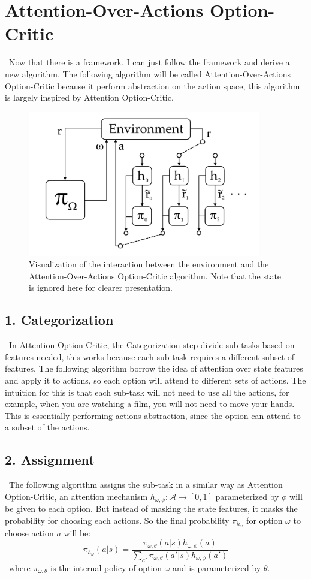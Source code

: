 \documentclass{article}
\begin{document}
	\section{Attention-Over-Actions Option-Critic}
	\qquad \ Now that there is a framework, I can just follow the framework and derive a new algorithm. The following algorithm will be called Attention-Over-Actions Option-Critic because it perform abstraction on the action space, this algorithm is largely inspired by Attention Option-Critic.
	\begin{figure}[h]
		\centering
		\includegraphics[width=4in]{aoaoc.png}
		\caption{Visualization of the interaction between the environment and the Attention-Over-Actions Option-Critic algorithm. Note that the state is ignored here for clearer presentation.}
	\end{figure}
	\subsection*{1. Categorization}
	\qquad \ In Attention Option-Critic, the Categorization step divide sub-tasks based on features needed, this works because each sub-task requires a different subset of features. The following algorithm borrow the idea of attention over state features and apply it to actions, so each option will attend to different sets of actions. The intuition for this is that each sub-task will not need to use all the actions, for example, when you are watching a film, you will not need to move your hands. This is essentially performing actions abstraction, since the option can attend to a subset of the actions.
	\subsection*{2. Assignment}
	\qquad \ The following algorithm assigns the sub-task in a similar way as Attention Option-Critic, an attention mechanism $h_{\omega,\phi}:\mathcal{A} \rightarrow [0,1]$ parameterized by $\phi$ will be given to each option. But instead of masking the state features, it masks the probability for choosing each actions. So the final probability $\pi_{h_\omega}$ for option $\omega$ to choose action $a$ will be: $$\pi_{h_\omega}(a|s) = \frac{\pi_{\omega,\theta}(a|s)h_{\omega, \phi}(a)}{\sum_{a'} \pi_{\omega,\theta}(a'|s)h_{\omega, \phi}(a')}$$ \qquad \ where $\pi_{\omega,\theta}$ is the internal policy of option $\omega$ and is parameterized by $\theta$.
	
\end{document}
